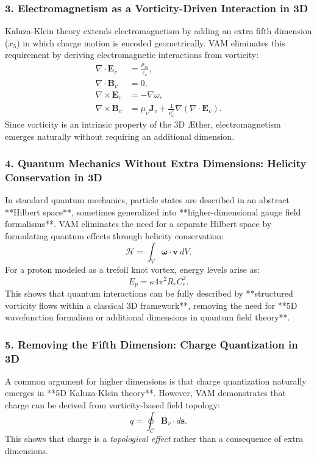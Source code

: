 \subsubsection{3. Electromagnetism as a Vorticity-Driven Interaction in 3D}
Kaluza-Klein theory extends electromagnetism by adding an extra fifth dimension (\( x_5 \)) in which charge motion is encoded geometrically. VAM eliminates this requirement by deriving electromagnetic interactions from vorticity:
\begin{align}
    \nabla \cdot \mathbf{E}_v &= \frac{\rho_{\text{\AE}}}{\varepsilon_v}, \\
    \nabla \cdot \mathbf{B}_v &= 0, \\
    \nabla \times \mathbf{E}_v &= -\nabla \omega, \\
    \nabla \times \mathbf{B}_v &= \mu_v \mathbf{J}_v + \frac{1}{\nu_{\omega}^2} \nabla (\nabla \cdot \mathbf{E}_v).
\end{align}
Since vorticity is an intrinsic property of the 3D Æther, electromagnetism emerges naturally without requiring an additional dimension.

\subsubsection{4. Quantum Mechanics Without Extra Dimensions: Helicity Conservation in 3D}
In standard quantum mechanics, particle states are described in an abstract **Hilbert space**, sometimes generalized into **higher-dimensional gauge field formalisms**. VAM eliminates the need for a separate Hilbert space by formulating quantum effects through helicity conservation:
\begin{equation}
    \mathcal{H} = \int_V \mathbf{\omega} \cdot \mathbf{v} \ dV.
\end{equation}
For a proton modeled as a trefoil knot vortex, energy levels arise as:
\begin{equation}
    E_p = \kappa 4\pi^2 R_c C_e^2.
\end{equation}
This shows that quantum interactions can be fully described by **structured vorticity flows within a classical 3D framework**, removing the need for **5D wavefunction formalism or additional dimensions in quantum field theory**.

\subsubsection{5. Removing the Fifth Dimension: Charge Quantization in 3D}
A common argument for higher dimensions is that charge quantization naturally emerges in **5D Kaluza-Klein theory**. However, VAM demonstrates that charge can be derived from vorticity-based field topology:
\begin{equation}
    q = \oint_{\mathcal{C}} \mathbf{B}_v \cdot d\mathbf{s}.
\end{equation}
This shows that charge is a \textit{topological effect} rather than a consequence of extra dimensions.

